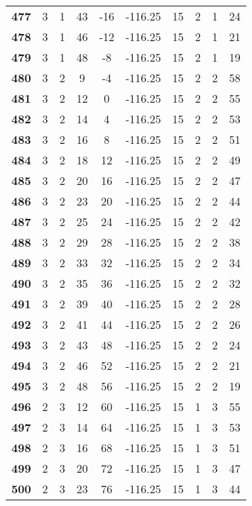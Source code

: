 \documentclass{article}%
\begin{document}
\begin{longtable}{cccccccccc}
        \textbf{477} & 3 & 1 & 43 & -16 & -116.25 & 15 & 2 & 1 & 24 \\ 
        \textbf{478} & 3 & 1 & 46 & -12 & -116.25 & 15 & 2 & 1 & 21 \\ 
        \textbf{479} & 3 & 1 & 48 & -8 & -116.25 & 15 & 2 & 1 & 19 \\ 
        \textbf{480} & 3 & 2 & 9 & -4 & -116.25 & 15 & 2 & 2 & 58 \\ 
        \textbf{481} & 3 & 2 & 12 & 0 & -116.25 & 15 & 2 & 2 & 55 \\ 
        \textbf{482} & 3 & 2 & 14 & 4 & -116.25 & 15 & 2 & 2 & 53 \\ 
        \textbf{483} & 3 & 2 & 16 & 8 & -116.25 & 15 & 2 & 2 & 51 \\ 
        \textbf{484} & 3 & 2 & 18 & 12 & -116.25 & 15 & 2 & 2 & 49 \\ 
        \textbf{485} & 3 & 2 & 20 & 16 & -116.25 & 15 & 2 & 2 & 47 \\ 
        \textbf{486} & 3 & 2 & 23 & 20 & -116.25 & 15 & 2 & 2 & 44 \\ 
        \textbf{487} & 3 & 2 & 25 & 24 & -116.25 & 15 & 2 & 2 & 42 \\ 
        \textbf{488} & 3 & 2 & 29 & 28 & -116.25 & 15 & 2 & 2 & 38 \\ 
        \textbf{489} & 3 & 2 & 33 & 32 & -116.25 & 15 & 2 & 2 & 34 \\ 
        \textbf{490} & 3 & 2 & 35 & 36 & -116.25 & 15 & 2 & 2 & 32 \\ 
        \textbf{491} & 3 & 2 & 39 & 40 & -116.25 & 15 & 2 & 2 & 28 \\ 
        \textbf{492} & 3 & 2 & 41 & 44 & -116.25 & 15 & 2 & 2 & 26 \\ 
        \textbf{493} & 3 & 2 & 43 & 48 & -116.25 & 15 & 2 & 2 & 24 \\ 
        \textbf{494} & 3 & 2 & 46 & 52 & -116.25 & 15 & 2 & 2 & 21 \\ 
        \textbf{495} & 3 & 2 & 48 & 56 & -116.25 & 15 & 2 & 2 & 19 \\ 
        \textbf{496} & 2 & 3 & 12 & 60 & -116.25 & 15 & 1 & 3 & 55 \\ 
        \textbf{497} & 2 & 3 & 14 & 64 & -116.25 & 15 & 1 & 3 & 53 \\ 
        \textbf{498} & 2 & 3 & 16 & 68 & -116.25 & 15 & 1 & 3 & 51 \\ 
        \textbf{499} & 2 & 3 & 20 & 72 & -116.25 & 15 & 1 & 3 & 47 \\ 
        \textbf{500} & 2 & 3 & 23 & 76 & -116.25 & 15 & 1 & 3 & 44 \\ 

\end{longtable}
\end{document}
